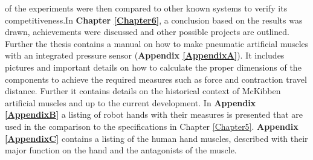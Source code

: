\documentclass[main]{subfiles}
\begin{document}
of the experiments were then compared to other known systems to verify its competitiveness.In \textbf{Chapter \ref{Chapter6}}, a conclusion based on the results was drawn, achievements were discussed and other possible projects are outlined.\\ Further the thesis contains a manual on how to make pneumatic artificial muscles with an integrated pressure sensor (\textbf{Appendix \ref{AppendixA}}). It includes pictures and important details on how to calculate the proper dimensions of the components to achieve the required measures such as force and contraction travel distance. Further it contains details on the historical context of McKibben artificial muscles and up to the current development. In \textbf{Appendix \ref{AppendixB}} a listing of robot hands with their measures is presented that are used in the comparison to the specifications in Chapter \ref{Chapter5}. \textbf{Appendix \ref{AppendixC}} contains a listing of the human hand muscles, described with their major function on the hand and the antagonists of the muscle.

\end{document}
